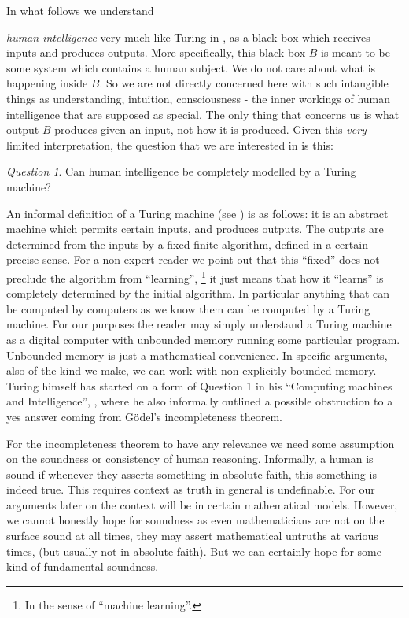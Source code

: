 \documentclass{amsart}  %
\numberwithin{equation}{section}
\theoremstyle{definition}
\theoremstyle{remark}
\newtheorem{question}{Question}
\begin{document}
In what follows we understand {\emph{human intelligence}  very much like Turing in \cite{TuringComputingMachines}, as a black box which receives inputs and produces outputs. More specifically, this black box $B$ is meant to be some system which contains a human subject. We do not care about what is happening inside $B$.
So we are not directly concerned here with such intangible things as understanding, intuition, consciousness - the inner workings of human intelligence that are supposed as special.  The only thing that concerns us is what output $B$ produces given an input, not how it is produced. Given this \emph{very} limited interpretation, the question that we are interested in is this: 
\begin{question} \label{quest1}
 Can human intelligence  be completely modelled by a Turing machine?  
\end{question}
An informal definition of a  Turing machine (see \cite{TuringComputableNumbers}) is as follows: 
it is an abstract machine which permits certain inputs, and produces outputs. The outputs are determined from the inputs by a fixed finite algorithm, defined in a certain precise sense. 
For a non-expert reader we point out that this ``fixed'' does not preclude the algorithm from ``learning'', \footnote {In the sense of ``machine learning''.} it just means that how it ``learns'' is completely determined by the initial algorithm. In particular anything that can be computed by computers as we know them can be computed by a Turing machine.  For our purposes the reader may simply understand a Turing machine as a digital computer with unbounded memory running some particular program. Unbounded memory is just a mathematical convenience.  In specific arguments, also of the kind we make, we can work with non-explicitly bounded memory.  
Turing himself has started on a form of Question 1 in his ``Computing machines and Intelligence'', \cite{TuringComputingMachines}, where he also informally outlined a  possible obstruction to a yes answer coming from G\"odel's incompleteness theorem. 


For the incompleteness theorem to have any relevance we need some assumption on the soundness or consistency of human reasoning.  
Informally, a human is sound if whenever they asserts something in absolute faith, this something is indeed true. This requires context as truth in general is undefinable.  For our arguments later on the context will be in certain mathematical models. 
However, we cannot honestly hope for soundness as even mathematicians are not on the surface sound at all times, they may assert mathematical untruths at various  times, (but usually not in absolute faith). But we can certainly hope for some kind of fundamental soundness.


}
\end{document}
